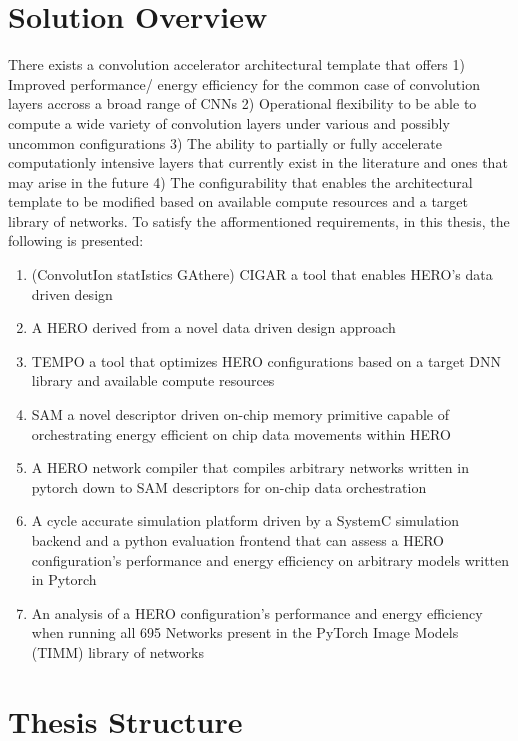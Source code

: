 \section{Solution Overview}
\label{chap:intro:solution_overview}

There exists a convolution accelerator architectural template that offers 1)
Improved performance/ energy efficiency for the common case of convolution
layers accross a broad range of \ac{CNN}s 2) Operational flexibility to be able
to compute a wide variety of convolution layers under various and possibly
uncommon configurations 3) The ability to partially or fully accelerate
computationly intensive layers that currently exist in the literature and ones
that may arise in the future 4) The configurability that enables the
architectural template to be modified based on available compute resources and a
target library of networks. To satisfy the afformentioned requirements, in this
thesis, the following is presented: 
\begin{enumerate}
    \item (ConvolutIon statIstics GAthere) \ac{CIGAR} a tool that enables \ac{HERO}'s data driven design
    \item A \ac{HERO} derived from a novel data driven design approach
    \item TEMPO a tool that optimizes \ac{HERO} configurations based on a target \ac{DNN} library and available compute resources 
    \item \ac{SAM} a novel descriptor driven on-chip memory primitive capable of orchestrating
    energy efficient on chip data movements within \ac{HERO}
    \item A HERO network compiler that compiles arbitrary networks written in
    pytorch down to SAM descriptors for on-chip data orchestration
    \item A cycle accurate simulation platform driven by a SystemC simulation
    backend and a python evaluation frontend that can assess a HERO configuration's
performance and energy efficiency on arbitrary models written in Pytorch
    \item An analysis of a HERO configuration's performance and energy efficiency
    when running all 695 Networks present in the PyTorch Image Models (TIMM) library of
    networks \cite{timm}
\end{enumerate}


\section{Thesis Structure}
\label{chap:intro:thesis_structure}

